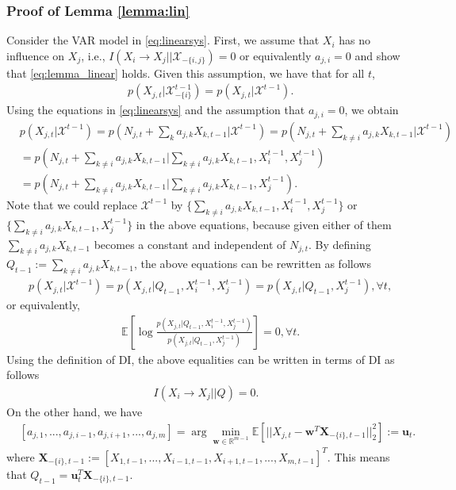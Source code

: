 \subsubsection{Proof of Lemma \ref{lemma:lin}}
Consider the VAR model in \eqref{eq:linearsys}. 
First, we assume that $X_i$ has no influence on $X_j$, i.e., $I(X_i\rightarrow X_j||\mathcal{X}_{-\{i,j\}})=0$ or equivalently $a_{j,i}=0$ and show that \eqref{eq:lemma_linear} holds. Given this assumption, we have that for all $t$,
\begin{align*}
    &p(X_{j,t}|\mathcal{X}_{-\{i\}}^{t-1})=p(X_{j,t}|\mathcal{X}^{t-1}).
\end{align*}
Using the equations in \eqref{eq:linearsys} and the assumption that $a_{j,i}=0$, we obtain
\begin{align*}
    &p(X_{j,t}|\mathcal{X}^{t-1})= p(N_{j,t}+\sum_{k}a_{j,k}X_{k,t-1}|\mathcal{X}^{t-1})=p(N_{j,t}+\sum_{k\neq i}a_{j,k}X_{k,t-1}|\mathcal{X}^{t-1})\\ 
    &=p(N_{j,t}+\sum_{k\neq i}a_{j,k}X_{k,t-1}|\sum_{k\neq i}a_{j,k}X_{k,t-1},{X}_{i}^{t-1},{X}_{j}^{t-1})\\
    &=p(N_{j,t}+\sum_{k\neq i}a_{j,k}X_{k,t-1}|\sum_{k\neq i}a_{j,k}X_{k,t-1},{X}_{j}^{t-1}).
\end{align*}
Note that we could replace $\mathcal{X}^{t-1}$ by $\{\sum_{k\neq i}a_{j,k}X_{k,t-1},{X}_{i}^{t-1},{X}_{j}^{t-1}\}$ or\\
$\{\sum_{k\neq i}a_{j,k}X_{k,t-1},{X}_{j}^{t-1}\}$ in the above equations, because given either of them $\sum_{k\neq i}a_{j,k}X_{k,t-1}$ becomes a constant and independent of $N_{j,t}$.
By defining $Q_{t-1}:=\sum_{k\neq i}a_{j,k}X_{k,t-1}$, the above equations can be rewritten as follows 
\begin{align*}
    &p(X_{j,t}|\mathcal{X}^{t-1})=p(X_{j,t}|Q_{t-1},{X}_{i}^{t-1},{X}_{j}^{t-1})=p(X_{j,t}|Q_{t-1},{X}_{j}^{t-1}), \forall t,
\end{align*}
or equivalently, 
\begin{align*}
    &\mathbb{E}\left[\log\frac{p(X_{j,t}|Q_{t-1},{X}_{i}^{t-1},{X}_{j}^{t-1})}{p(X_{j,t}|Q_{t-1},{X}_{j}^{t-1})}\right]=0, \forall t.
\end{align*}
Using the definition of DI, the above equalities can be written in terms of DI as follows
\begin{align*}
   I(X_i\rightarrow X_j||Q)=0.
\end{align*}
On the other hand, we have 
\begin{align*}
&[a_{j,1},...,a_{j,i-1},a_{j,i+1},...,a_{j,m}]=\arg\min_{\textbf{w}\in\mathbb{R}^{m-1}}\mathbb{E}\left[||X_{j,t}- \textbf{w}^T \textbf{X}_{-\{i\},t-1}||_2^2\right]:=\textbf{u}_t.
\end{align*}
where $\textbf{X}_{-\{i\},t-1} :=[X_{1,t-1},..., X_{i-1,t-1}, X_{i+1,t-1},..., X_{m,t-1} ]^T$. This means that $Q_{t-1}=\textbf{u}_t^T\textbf{X}_{-\{i\},t-1}$.

